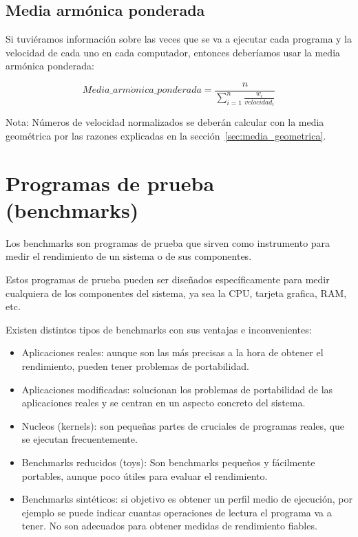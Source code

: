 \documentclass[12pt,onecolumn]{memoir}
\begin{document}
\subsection{Media armónica ponderada}

Si tuviéramos información sobre las veces que se va a ejecutar cada
programa y la velocidad de cada uno en cada computador, entonces deberíamos usar la media armónica ponderada:

\[ Media\_arm\acute{o}nica\_ponderada = \frac{n}{\sum_{i=1}^{n} \frac{w_i}{velocidad_i}} \]

Nota: Números de velocidad normalizados se deberán calcular con la
media geométrica por las razones explicadas en la
sección~\ref{sec:media_geometrica}.

\section{Programas de prueba (benchmarks)}

Los benchmarks son programas de prueba que sirven como instrumento para medir el rendimiento de un sistema o de sus componentes. 

Estos programas de prueba pueden ser diseñados específicamente para
medir cualquiera de los componentes del sistema, ya sea la CPU,
tarjeta grafica, RAM, etc.

Existen distintos tipos de benchmarks con sus ventajas e inconvenientes:

\begin{itemize}

\item Aplicaciones reales: aunque son las más precisas a la hora de
  obtener el rendimiento, pueden tener problemas de portabilidad.

\item Aplicaciones modificadas: solucionan los problemas de
  portabilidad de las aplicaciones reales y se centran en un aspecto
  concreto del sistema.
  
\item Nucleos (kernels): son pequeñas partes de cruciales de programas reales, que se
  ejecutan frecuentemente.

\item Benchmarks reducidos (toys): Son benchmarks pequeños y
  fácilmente portables, aunque poco útiles para evaluar el rendimiento.

\item Benchmarks sintéticos: si objetivo es obtener un perfil medio de
  ejecución, por ejemplo se puede indicar cuantas operaciones de
  lectura el programa va a tener. No son adecuados para
  obtener medidas de rendimiento fiables.

\end{itemize}
\end{document}
